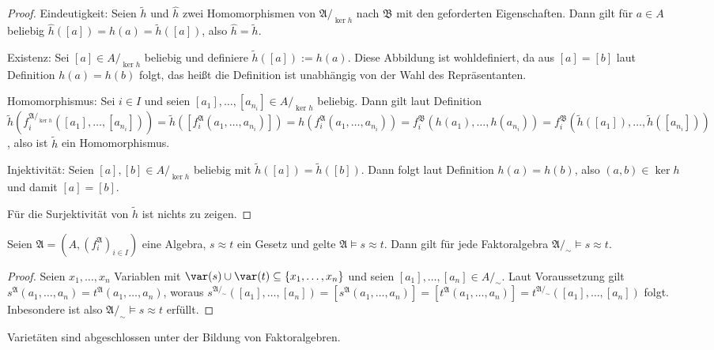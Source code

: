\begin{proof}
    Eindeutigkeit: Seien $\tilde{h}$ und $\hat{h}$ zwei Homomorphismen von $\mathfrak{A}/_{\ker h}$ nach $\mathfrak{B}$ mit den geforderten Eigenschaften.
    Dann gilt für $a\in A$ beliebig $\hat{h}([a])=h(a)=\tilde{h}([a])$, also $\hat{h}=\tilde{h}$.

    Existenz: Sei $[a]\in A/_{\ker h}$ beliebig und definiere $\tilde{h}([a]):=h(a)$. Diese Abbildung ist wohldefiniert,
    da aus $[a]=[b]$ laut Definition $h(a)=h(b)$ folgt, das heißt die Definition ist unabhängig von der Wahl des Repräsentanten.

    Homomorphismus: Sei $i\in I$ und seien $[a_1],\ldots,[a_{n_i}]\in A/_{\ker h}$ beliebig. Dann gilt laut Definition
    $\tilde{h}(f^{\mathfrak{A}/_{\ker h}}_i([a_1],\ldots,[a_{n_i}]))=\tilde{h}([f^\mathfrak{A}_i(a_1,\ldots,a_{n_i})])=h(f^\mathfrak{A}_i(a_1,\ldots,a_{n_i}))=f^\mathfrak{B}_i(h(a_1),\ldots,h(a_{n_i}))=f^\mathfrak{B}_i(\tilde{h}([a_1]),\ldots,\tilde{h}([a_{n_i}]))$,
    also ist $\tilde{h}$ ein Homomorphismus.

    Injektivität: Seien $[a],[b]\in A/_{\ker h}$ beliebig mit $\tilde{h}([a])=\tilde{h}([b])$. Dann folgt laut Definition
    $h(a)=h(b)$, also $(a,b)\in\ker h$ und damit $[a]=[b]$.
    
    Für die Surjektivität von $\tilde{h}$ ist nichts zu zeigen.
\end{proof}

\begin{proposition}
    Seien $\mathfrak{A}=(A,(f^\mathfrak{A}_i)_{i\in I})$ eine Algebra, $s\approx t$ ein Gesetz und gelte $\mathfrak{A}\models s\approx t$.
    Dann gilt für jede Faktoralgebra $\mathfrak{A}/_\sim\models s\approx t$.
\end{proposition}

\begin{proof}
    Seien $x_1,\ldots,x_n$ Variablen mit $\var(s)\cup\var(t)\subseteq\{x_1,\ldots,x_n\}$ und seien
    $[a_1],\ldots,[a_n] \in A/_\sim$. Laut Voraussetzung gilt $s^\mathfrak{A}(a_1,\ldots,a_n)=t^\mathfrak{A}(a_1,\ldots,a_n)$, woraus
    $s^{\mathfrak{A}/_\sim}([a_1],\ldots,[a_n])=[s^\mathfrak{A}(a_1,\ldots,a_n)]=[t^\mathfrak{A}(a_1,\ldots,a_n)]=t^{\mathfrak{A}/_\sim}([a_1],\ldots,[a_n])$ folgt.
    Inbesondere ist also $\mathfrak{A}/_\sim\models s\approx t$ erfüllt.
\end{proof}

\begin{corollary}\label{corollary:fak-varietaeten}
    Varietäten sind abgeschlossen unter der Bildung von Faktoralgebren.
\end{corollary}

